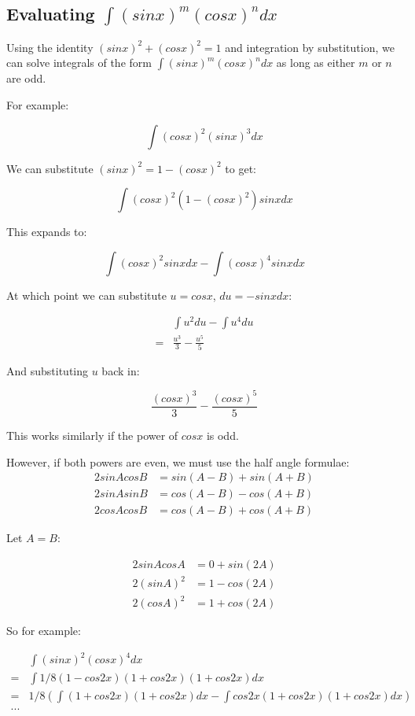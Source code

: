 \documentclass{article}
\begin{document}
\subsection{Evaluating $\int (sinx)^m (cosx)^ndx$}

Using the identity $(sinx)^2 + (cosx)^2 = 1$ and integration by
substitution, we can solve integrals of the form $\int (sinx)^m
(cosx)^ndx$ as long as either $m$ or $n$ are odd.

For example:

\[
\int (cosx)^2(sinx)^3dx
\]

We can substitute $(sinx)^2 = 1 - (cosx)^2$ to get:

\[
\int (cosx)^2 (1-(cosx)^2) sinx dx
\]

This expands to:

\[
\int (cosx)^2 sinx dx - \int (cosx)^4 sinx dx
\]

At which point we can substitute $u = cosx$, $du = -sinx dx$:

\begin{align*}
  &\int u^2 du - \int u^4 du \\
  = &\frac{u^3}{3} - \frac{u^5}{5}
\end{align*}

And substituting $u$ back in:

\[
\frac{(cosx)^3}{3} - \frac{(cosx)^5}{5}
\]

This works similarly if the power of $cosx$ is odd.

\newpage

However, if both powers are even, we must use the half angle formulae:
\
\begin{align*}
  2 sinA cosB &= sin(A - B) + sin(A + B) \\
  2 sinA sinB &= cos(A - B) - cos(A + B) \\
  2 cosA cosB &= cos(A - B) + cos(A + B)
\end{align*}

Let $A=B$:

\begin{align*}
  2 sinA cosA &= 0 + sin(2A) \\
  2 (sinA)^2 &= 1 - cos(2A) \\
  2 (cosA)^2 &= 1 + cos(2A)
\end{align*}

So for example:

\begin{align*}
  &\int (sinx)^2 (cosx)^4 dx \\
  = &\int 1/8 (1 - cos2x) (1 + cos2x) (1 + cos2x) dx  \\
  = &1/8 (\int (1 + cos2x) (1 + cos2x) dx - \int cos2x (1 + cos2x) (1 + cos2x) dx) \\
  ...
\end{align*}
\end{document}
